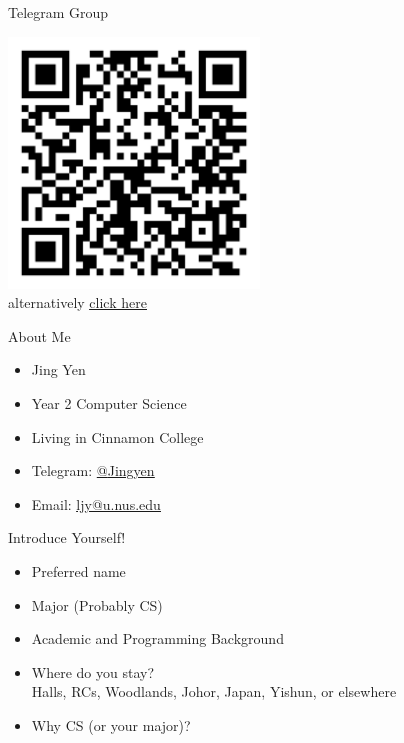 \documentclass[10pt]{beamer}
\begin{document}
\begin{frame}[fragile]{Telegram Group}
\begin{center}
  \includegraphics[width=0.5\textwidth]{teleqr.png} \\
  alternatively \href{https://t.me/joinchat/DJDbrBmLMZciD4D4Z_Bodw}{\underline{click here}}
\end{center}
\end{frame}

\begin{frame}[fragile]{About Me}
  \begin{itemize}
    \item Jing Yen
    \item Year 2 Computer Science
    \item Living in Cinnamon College
    \item Telegram: \href{https://t.me/JingYen}{@\underline{Jingyen}}
    \item Email: \href{mailto:ljy@u.nus.edu}{\underline{ljy@u.nus.edu}}
  \end{itemize}
\end{frame}

\begin{frame}[fragile]{Introduce Yourself!}
  \begin{itemize}
    \item Preferred name
    \item Major (Probably CS)
    \item Academic and Programming Background
    \item Where do you stay?  \\ Halls, RCs, Woodlands, Johor, Japan, Yishun, or elsewhere
    \item Why CS (or your major)?
  \end{itemize}
\end{frame}
\end{document}
